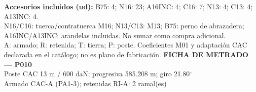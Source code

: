 \begingroup\scriptsize
\textbf{Accesorios incluidos (ud):} B75: 4; N16: 23; A16INC: 4; C16: 7; N13: 4; C13: 4; A13INC: 4.\\
N16/C16: tuerca/contratuerca M16; N13/C13: M13; B75: perno de abrazadera; A16INC/A13INC: arandelas incluidas. No sumar como compra adicional.\\
A: armado; R: retenida; T: tierra; P: poste. Coeficientes M01 y adaptación CAC declarada en el catálogo; no es plano de fabricación.
\endgroup\endgroup
\clearpage{}
\begingroup\small\setlength{\parskip}{3pt}\renewcommand{\arraystretch}{1.05}
\textbf{\large FICHA DE METRADO — P010}\\[4pt]
Poste CAC 13 m / 600 daN; progresiva 585.208 m; giro 21.80\ensuremath{^\circ}\\
Armado CAC-A (PA1-3); retenidas RI-A: 2 ramal(es)\\
\begingroup\scriptsize
